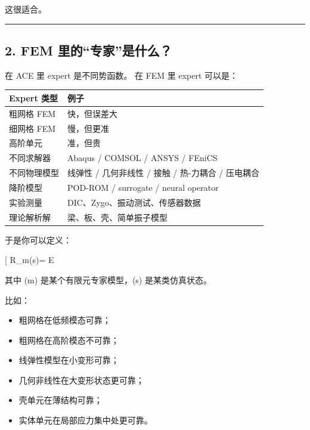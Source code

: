 \documentclass[
  12pt,
]{ctexart}
\providecommand{\tightlist}{%
  \setlength{\itemsep}{0pt}\setlength{\parskip}{0pt}}
\begin{document}
这很适合。

\begin{center}\rule{0.5\linewidth}{0.5pt}\end{center}

\subsection{2. FEM
里的``专家''是什么？}\label{fem-ux91ccux7684ux4e13ux5bb6ux662fux4ec0ux4e48}

在 ACE 里 expert 是不同势函数。 在 FEM 里 expert 可以是：

\begin{longtable}[]{@{}
  >{\raggedright\arraybackslash}p{}
  >{\raggedright\arraybackslash}p{}@{}}
\toprule\noalign{}
\begin{minipage}[b]{\linewidth}\raggedright
Expert 类型
\end{minipage} & \begin{minipage}[b]{\linewidth}\raggedright
例子
\end{minipage} \\
\midrule\noalign{}
\endhead
\bottomrule\noalign{}
\endlastfoot
粗网格 FEM & 快，但误差大 \\
细网格 FEM & 慢，但更准 \\
高阶单元 & 准，但贵 \\
不同求解器 & Abaqus / COMSOL / ANSYS / FEniCS \\
不同物理模型 & 线弹性 / 几何非线性 / 接触 / 热-力耦合 / 压电耦合 \\
降阶模型 & POD-ROM / surrogate / neural operator \\
实验测量 & DIC、Zygo、振动测试、传感器数据 \\
理论解析解 & 梁、板、壳、简单振子模型 \\
\end{longtable}

于是你可以定义：

{[} R\_m(s)= \mathbb E\left[
\ell(y_m(x),y_{\mathrm{ref}}(x))\mid x\in s
\right]{]}

其中 (m) 是某个有限元专家模型，(s) 是某类仿真状态。

比如：

\begin{itemize}
\tightlist
\item
  粗网格在低频模态可靠；
\item
  粗网格在高阶模态不可靠；
\item
  线弹性模型在小变形可靠；
\item
  几何非线性在大变形状态更可靠；
\item
  壳单元在薄结构可靠；
\item
  实体单元在局部应力集中处更可靠。
\end{itemize}
\end{document}
